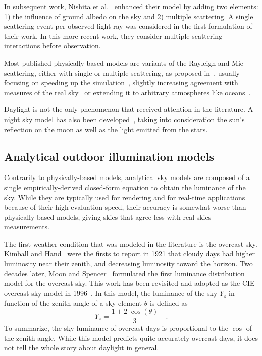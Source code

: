 In subsequent work, Nishita et al.~\cite{nishita1996display} enhanced their model by adding two elements: 1) the influence of ground albedo on the sky and 2) multiple scattering. A single scattering event per observed light ray was considered in the first formulation of their work. In this more recent work, they consider multiple scattering interactions before observation.

Most published physically-based models are variants of the Rayleigh and Mie scattering, either with single or multiple scattering, as proposed in~\cite{nishita1993display,nishita1996display}, usually focusing on speeding up the simulation~\cite{oneal2005accurate}, slightly increasing agreement with measures of the real sky~\cite{haber2005physically,bruneton2008precomputed} or extending it to arbitrary atmospheres like oceans~\cite{elek2010real}.

Daylight is not the only phenomenon that received attention in the literature. A night sky model has also been developed~\cite{jensen2001nightskymodel}, taking into consideration the sun's reflection on the moon as well as the light emitted from the stars.

\subsection{Analytical outdoor illumination models}

Contrarily to physically-based models, analytical sky models are composed of a single empirically-derived closed-form equation to obtain the luminance of the sky. While they are typically used for rendering and for real-time applications because of their high evaluation speed, their accuracy is somewhat worse than physically-based models, giving skies that agree less with real skies measurements.

The first weather condition that was modeled in the literature is the overcast sky. Kimball and Hand~\cite{kimball1921sky} were the firsts to report in 1921 that cloudy days had higher luminosity near their zenith, and decreasing luminosity toward the horizon. Two decades later, Moon and Spencer~\cite{moon1942illumination} formulated the first luminance distribution model for the overcast sky. This work has been revisited and adopted as the CIE overcast sky model in 1996~\cite{cie1996s}. In this model, the luminance of the sky $Y_z$ in function of the zenith angle of a sky element $\theta$ is defined as
\begin{equation}
Y_z = \frac{1 + 2 \; \cos\left( \theta \right)}{3} \quad.
\end{equation}
To summarize, the sky luminance of overcast days is proportional to the $\cos$ of the zenith angle. While this model predicts quite accurately overcast days, it does not tell the whole story about daylight in general.

